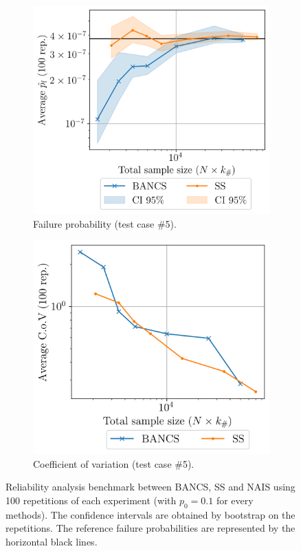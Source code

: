 \begin{figure}
    \begin{subfigure}[b]{0.49\linewidth}
        \centering
        \includegraphics[width=\linewidth]{part3/figures/BANCS/Oscillator_mean.png}
        \caption{Failure probability (test case \#5).}
    \end{subfigure}
    \begin{subfigure}[b]{0.47\linewidth}
        \centering
        \includegraphics[width=\linewidth]{part3/figures/BANCS/Oscillator_cov.png}
        \caption{Coefficient of variation (test case \#5).}
    \end{subfigure}
    \caption{Reliability analysis benchmark between BANCS, SS and NAIS using 100 repetitions of each experiment (with $p_0=0.1$ for every methods). 
                The confidence intervals are obtained by bootstrap on the repetitions. 
                The reference failure probabilities are represented by the horizontal black lines.}
    \label{fig:bancs_benchmark}
\end{figure}

